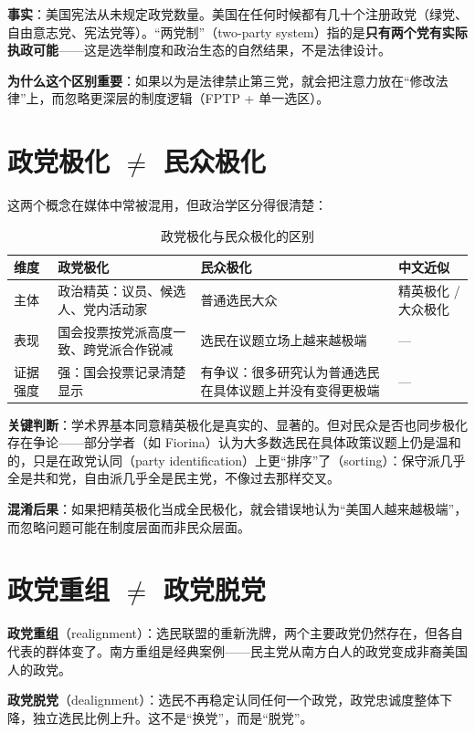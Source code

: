 \documentclass[12pt,a4paper]{ctexart}
\begin{document}
\textbf{事实}：美国宪法从未规定政党数量。美国在任何时候都有几十个注册政党（绿党、自由意志党、宪法党等）。``两党制''（two-party system）指的是\textbf{只有两个党有实际执政可能}——这是选举制度和政治生态的自然结果，不是法律设计。

\textbf{为什么这个区别重要}：如果以为是法律禁止第三党，就会把注意力放在``修改法律''上，而忽略更深层的制度逻辑（FPTP + 单一选区）。

\section{政党极化 $\neq$ 民众极化}

这两个概念在媒体中常被混用，但政治学区分得很清楚：

\begin{table}[h]
\centering
\caption{政党极化与民众极化的区别}
\begin{tabular}{@{}lp{4.8cm}p{4.8cm}p{3.4cm}@{}}
\toprule
\textbf{维度} & \textbf{政党极化} & \textbf{民众极化} & \textbf{中文近似} \\
\midrule
主体 & 政治精英：议员、候选人、党内活动家 & 普通选民大众 & 精英极化 / 大众极化 \\
表现 & 国会投票按党派高度一致、跨党派合作锐减 & 选民在议题立场上越来越极端 & --- \\
证据强度 & 强：国会投票记录清楚显示 & 有争议：很多研究认为普通选民在具体议题上并没有变得更极端 & --- \\
\bottomrule
\end{tabular}
\end{table}

\textbf{关键判断}：学术界基本同意精英极化是真实的、显著的。但对民众是否也同步极化存在争论——部分学者（如 Fiorina）认为大多数选民在具体政策议题上仍是温和的，只是在政党认同（party identification）上更``排序''了（sorting）：保守派几乎全是共和党，自由派几乎全是民主党，不像过去那样交叉。

\textbf{混淆后果}：如果把精英极化当成全民极化，就会错误地认为``美国人越来越极端''，而忽略问题可能在制度层面而非民众层面。

\section{政党重组 $\neq$ 政党脱党}

\textbf{政党重组}（realignment）：选民联盟的重新洗牌，两个主要政党仍然存在，但各自代表的群体变了。南方重组是经典案例——民主党从南方白人的政党变成非裔美国人的政党。

\textbf{政党脱党}（dealignment）：选民不再稳定认同任何一个政党，政党忠诚度整体下降，独立选民比例上升。这不是``换党''，而是``脱党''。
\end{document}

